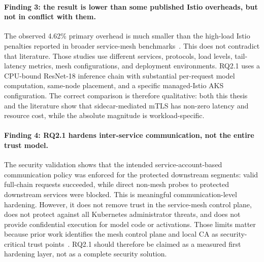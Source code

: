 \paragraph{Finding 3: the result is lower than some published Istio overheads, but not in conflict with them.}
The observed 4.62\% primary overhead is much smaller than the high-load Istio
penalties reported in broader service-mesh
benchmarks~\cite{bremlerbarr2025mtls}. This does not contradict that
literature. Those studies use different services, protocols, load levels,
tail-latency metrics, mesh configurations, and deployment environments. RQ2.1
uses a CPU-bound ResNet-18 inference chain with substantial per-request model
computation, same-node placement, and a specific managed-Istio AKS
configuration. The correct comparison is therefore qualitative: both this
thesis and the literature show that sidecar-mediated mTLS has non-zero latency
and resource cost, while the absolute magnitude is workload-specific.

\paragraph{Finding 4: RQ2.1 hardens inter-service communication, not the entire trust model.}
The security validation shows that the intended service-account-based
communication policy was enforced for the protected downstream segments:
valid full-chain requests succeeded, while direct non-mesh probes to protected
downstream services were blocked. This is meaningful communication-level
hardening. However, it does not remove trust in the service-mesh control
plane, does not protect against all Kubernetes administrator threats, and
does not provide confidential execution for model code or activations. Those
limits matter because prior work identifies the mesh control plane and local
CA as security-critical trust points~\cite{poudel2025mazu}. RQ2.1 should
therefore be claimed as a measured first hardening layer, not as a complete
security solution.

